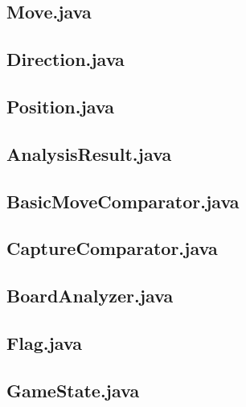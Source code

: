 \documentclass [12pt ,a4paper, english]{scrartcl}
\theoremstyle{plain}
\theoremstyle{definition}
\theoremstyle{remark}
\begin{document}
\subsection{Move.java}


\subsection{Direction.java}


\subsection{Position.java}


\subsection{AnalysisResult.java}


\subsection{BasicMoveComparator.java}


\subsection{CaptureComparator.java}

%
%

\subsection{BoardAnalyzer.java}


\subsection{Flag.java}


\subsection{GameState.java}

\end{document}
